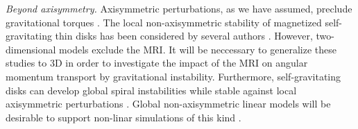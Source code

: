 %




\emph{Beyond axisymmetry.} Axisymmetric perturbations, as we have
assumed, preclude gravitational torques \citep{lynden-bell72}. 
The local non-axisymmetric stability of magnetized self-gravitating
thin disks has been considered by several authors
\citep{elmegreen87,gammie96b,fan97,kim01}. However, two-dimensional models
exclude the MRI. It will be neccessary to generalize these studies to
3D in order to investigate the impact of the MRI on angular momentum
transport by gravitational instability. Furthermore, self-gravitating
disks can develop global spiral instabilities while stable against local 
axisymmetric perturbations \citep{papaloizou89,papaloizou91}. Global
non-axisymmetric linear models will be desirable to support non-linar
simulations of this kind \citep{fromang04c,fromang05}.   



%


